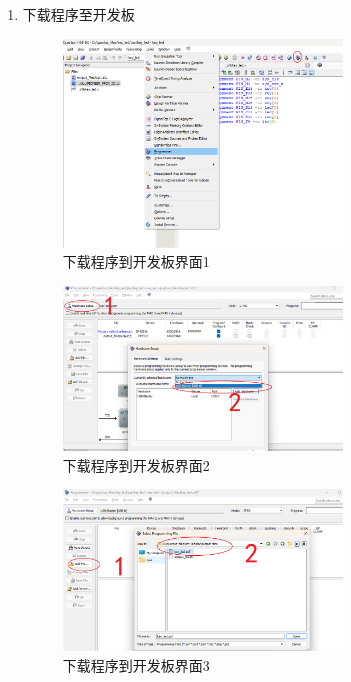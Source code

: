 \documentclass[UTF8]{article}
\theoremstyle{MyLineTheoremStyle} %
\theoremstyle{MyBlockTheoremStyle} %
\theoremstyle{MySubsubsectionStyle} %
\begin{document}
\begin{enumerate}
\cleardoublepage

    \item 下载程序至开发板
    \begin{figure}[H]
        \centering
        \includegraphics[width=0.7\textwidth]{step9.png}
        \caption{下载程序到开发板界面1}
        \label{fig:step9}
    \end{figure}

    \begin{figure}[H]
        \centering
        \includegraphics[width=0.7\textwidth]{step9_2.png}
        \caption{下载程序到开发板界面2}
        \label{fig:step9_2}
    \end{figure}

    \begin{figure}[H]
        \centering
        \includegraphics[width=0.7\textwidth]{step9_3.png}
        \caption{下载程序到开发板界面3}
        \label{fig:step9_3}
    \end{figure}


\end{enumerate}
\end{document}

